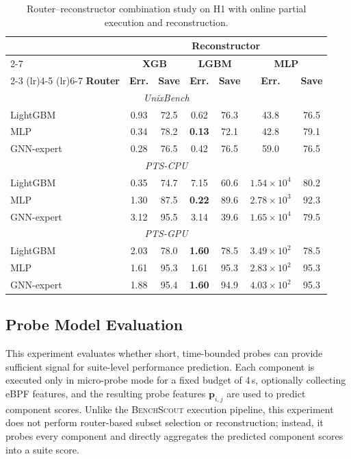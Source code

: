 \documentclass[sigplan,10pt]{acmart}
\newcommand{\ourmethod}{\textsc{BenchScout}\xspace}
\newcommand{\ptscpu}{PTS-CPU}
\newcommand{\ptsgpu}{PTS-GPU}
\begin{document}
\begin{table}[t]
\centering
\caption{Router--reconstructor combination study on H1 with online partial execution and reconstruction.}
\label{tab:model-combination}
\small
\setlength{\tabcolsep}{3pt}
\begin{tabular}{l|cc|cc|cc}
\toprule
& \multicolumn{6}{c}{\textbf{Reconstructor}} \\
\cmidrule(lr){2-7}
& \multicolumn{2}{c|}{\textbf{XGB}} 
& \multicolumn{2}{c|}{\textbf{LGBM}} 
& \multicolumn{2}{c}{\textbf{MLP}} \\
\cmidrule(lr){2-3} \cmidrule(lr){4-5} \cmidrule(lr){6-7}
\textbf{Router}
& \textbf{Err.} & \textbf{Save} 
& \textbf{Err.} & \textbf{Save} 
& \textbf{Err.} & \textbf{Save} \\
\midrule
\multicolumn{7}{c}{\textit{UnixBench}} \\
\midrule
LightGBM   & 0.93 & 72.5 & 0.62 & 76.3 & 43.8 & 76.5 \\
MLP        & 0.34 & 78.2 & \textbf{0.13} & 72.1 & 42.8 & 79.1 \\
GNN-expert & 0.28 & 76.5 & 0.42 & 76.5 & 59.0 & 76.5 \\
\midrule
\multicolumn{7}{c}{\textit{\ptscpu}} \\
\midrule
LightGBM   & 0.35 & 74.7 & 7.15 & 60.6 & $1.54{\times}10^{4}$ & 80.2 \\
MLP        & 1.30 & 87.5 & \textbf{0.22} & 89.6 & $2.78{\times}10^{3}$ & 92.3 \\
GNN-expert & 3.12 & 95.5 & 3.14 & 39.6 & $1.65{\times}10^{4}$ & 79.5 \\
\midrule
\multicolumn{7}{c}{\textit{\ptsgpu}} \\
\midrule
LightGBM   & 2.03 & 78.0 & \textbf{1.60} & 78.5 & $3.49{\times}10^{2}$ & 78.5 \\
MLP        & 1.61 & 95.3 & 1.61 & 95.3 & $2.83{\times}10^{2}$ & 95.3 \\
GNN-expert & 1.88 & 95.4 & \textbf{1.60} & 94.9 & $4.03{\times}10^{2}$ & 95.3 \\
\bottomrule
\end{tabular}
\end{table}




\subsection{Probe Model Evaluation}
\label{subsec:probe-evaluation}

This experiment evaluates whether short, time-bounded probes can provide sufficient signal for suite-level performance prediction.
Each component is executed only in micro-probe mode for a fixed budget of 4\,s, optionally collecting eBPF features, and the resulting probe features \(\mathbf{p}_{i,j}\) are used to predict component scores.
Unlike the \ourmethod{} execution pipeline, this experiment does not perform router-based subset selection or reconstruction; instead, it probes every component and directly aggregates the predicted component scores into a suite score.
\end{document}
